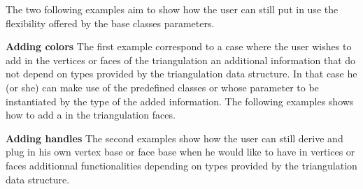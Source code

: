 The two following examples  aim to show how the user
can still put in use the flexibility offered by the
base classes parameters.

{\bf Adding colors} 
The first example correspond to a case where the user wishes to add in 
the vertices or faces of the triangulation  an additional information
that do not depend on types provided
by the triangulation data structure. 
In that case he (or she) can make use of the predefined classes
or 
whose parameter  to be instantiated by the type of the 
added information.
The following examples shows how to add a 
 in the triangulation faces.



{\bf Adding handles}
The second examples  show how the user can  still
derive and plug in his own vertex base 
or face base when he would like to have  in vertices or faces
additionnal functionalities depending on types provided by the triangulation
data structure. 













